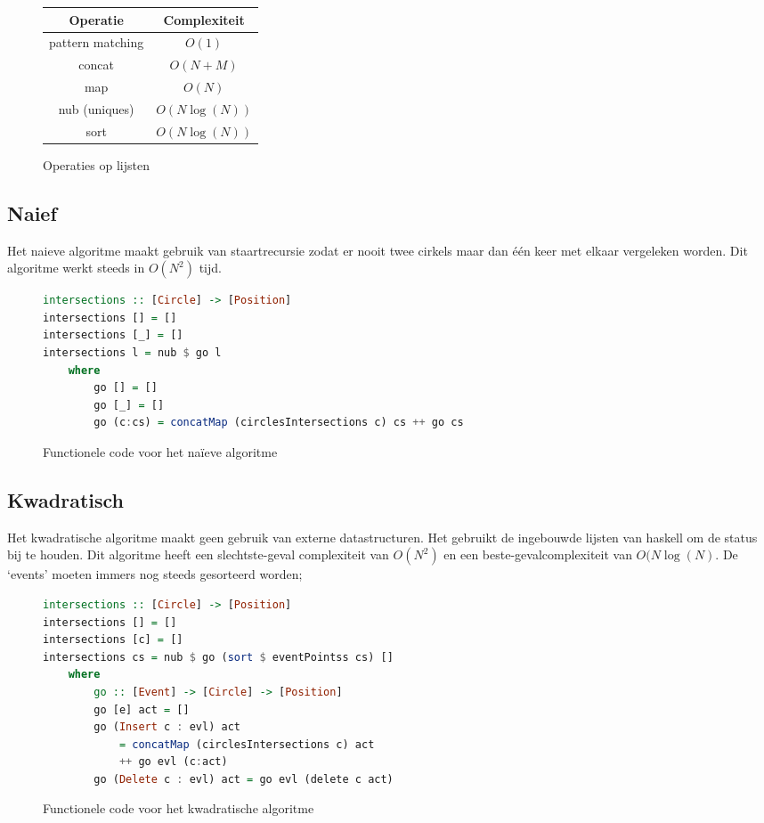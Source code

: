 \begin{figure}[H]
\centering
\begin{tabular}{|c|c|}
\hline
Operatie & Complexiteit\\
\hline\hline
pattern matching & $O(1)$\\\hline
concat & $O(N+M)$\\\hline
map & $O(N)$\\\hline
nub (uniques) & $O(N\log(N))$\\\hline
sort & $O(N\log(N))$\\\hline
\end{tabular}
\label{fig:list_performance}
\caption{Operaties op lijsten}
\end{figure}

\newpage
\subsection{Naief}
Het naieve algoritme maakt gebruik van staartrecursie zodat er nooit twee cirkels maar dan \'e\'en keer met elkaar vergeleken worden. Dit algoritme werkt steeds in $O(N^2)$ tijd.

\begin{figure}[H]
\begin{lstlisting}[language=Haskell]
intersections :: [Circle] -> [Position]
intersections [] = []
intersections [_] = []
intersections l = nub $ go l
    where
        go [] = []
        go [_] = []
        go (c:cs) = concatMap (circlesIntersections c) cs ++ go cs
\end{lstlisting}
\label{imp:naive}
\caption{Functionele code voor het na\"ieve algoritme}
\end{figure}


\subsection{Kwadratisch}
Het kwadratische algoritme maakt geen gebruik van externe datastructuren. Het gebruikt de ingebouwde lijsten van haskell om de status bij te houden. Dit algoritme heeft een slechtste-geval complexiteit van $O(N^2)$ en een beste-gevalcomplexiteit van $O(N\log(N)$. De `events' moeten immers nog steeds gesorteerd worden;

\begin{figure}[H]
\begin{lstlisting}[language=Haskell]
intersections :: [Circle] -> [Position]
intersections [] = []
intersections [c] = []
intersections cs = nub $ go (sort $ eventPointss cs) []
    where
        go :: [Event] -> [Circle] -> [Position]
        go [e] act = []
        go (Insert c : evl) act 
        	= concatMap (circlesIntersections c) act 
        	++ go evl (c:act)
        go (Delete c : evl) act = go evl (delete c act)
\end{lstlisting}
\label{imp:quadratic}
\caption{Functionele code voor het kwadratische algoritme}
\end{figure}

